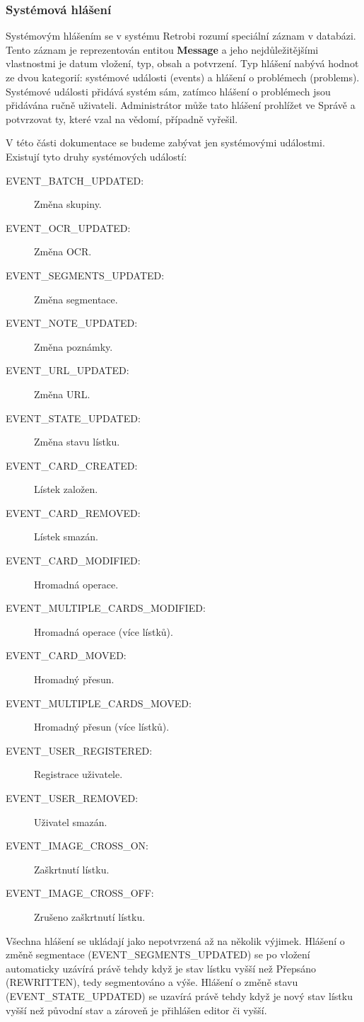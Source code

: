 \subsubsection{Systémová hlášení}

Systémovým hlášením se v systému Retrobi rozumí speciální záznam v databázi. Tento záznam je reprezentován entitou {\bf Message} a jeho nejdůležitějšími vlastnostmi je datum vložení, typ, obsah a potvrzení. Typ hlášení nabývá hodnot ze dvou kategorií: systémové události (events) a hlášení o problémech (problems). Systémové události přidává systém sám, zatímco hlášení o problémech jsou přidávána ručně uživateli. Administrátor může tato hlášení prohlížet ve Správě a potvrzovat ty, které vzal na vědomí, případně vyřešil.

V této části dokumentace se budeme zabývat jen systémovými událostmi. Existují tyto druhy systémových událostí:

\begin{description}
\item[EVENT\_BATCH\_UPDATED:]{Změna skupiny.}
\item[EVENT\_OCR\_UPDATED:]{Změna OCR.}
\item[EVENT\_SEGMENTS\_UPDATED:]{Změna segmentace.}
\item[EVENT\_NOTE\_UPDATED:]{Změna poznámky.}
\item[EVENT\_URL\_UPDATED:]{Změna URL.}
\item[EVENT\_STATE\_UPDATED:]{Změna stavu lístku.}
\item[EVENT\_CARD\_CREATED:]{Lístek založen.}
\item[EVENT\_CARD\_REMOVED:]{Lístek smazán.}
\item[EVENT\_CARD\_MODIFIED:]{Hromadná operace.}
\item[EVENT\_MULTIPLE\_CARDS\_MODIFIED:]{Hromadná operace (více lístků).}
\item[EVENT\_CARD\_MOVED:]{Hromadný přesun.}
\item[EVENT\_MULTIPLE\_CARDS\_MOVED:]{Hromadný přesun (více lístků).}
\item[EVENT\_USER\_REGISTERED:]{Registrace uživatele.}
\item[EVENT\_USER\_REMOVED:]{Uživatel smazán.}
\item[EVENT\_IMAGE\_CROSS\_ON:]{Zaškrtnutí lístku.}
\item[EVENT\_IMAGE\_CROSS\_OFF:]{Zrušeno zaškrtnutí lístku.}
\end{description}

Všechna hlášení se ukládají jako nepotvrzená až na několik výjimek. Hlášení o změně segmentace (EVENT\_SEGMENTS\_UPDATED) se po vložení automaticky uzávírá právě tehdy když je stav lístku vyšší než Přepsáno (REWRITTEN), tedy segmentováno a výše. Hlášení o změně stavu (EVENT\_STATE\_UPDATED) se uzavírá právě tehdy když je nový stav lístku vyšší než původní stav a zároveň je přihlášen editor či vyšší.

